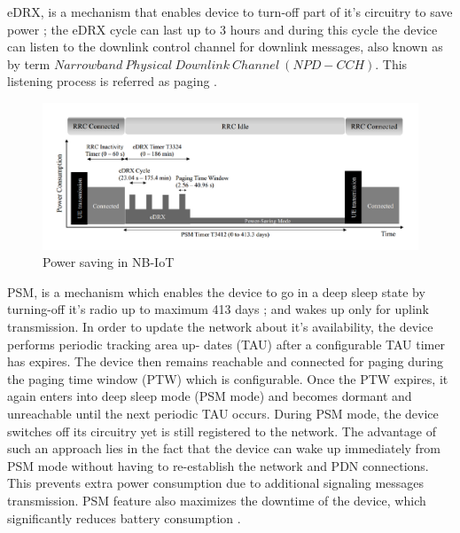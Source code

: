 \documentclass[12pt]{article}
\begin{document}
eDRX, is a mechanism that enables device to turn-off part of it's circuitry to save power \cite{el2018evaluating}; the eDRX cycle can last up to 3 hours \cite{farrell2018low} and during this cycle the device can listen to the downlink control channel for downlink messages, also known as by term  $Narrowband\  Physical\  Downlink\  Channel\  (NPD-CCH)$. This listening process is referred as paging \cite{sultania2019implementation}.\par 

\begin{figure}[H]
    \centering
    \includegraphics[width=0.9\columnwidth]{Images/nbiotDRXcycle.pdf}
    \caption{Power saving in NB-IoT \cite{sultania2019implementation} }
    \label{fig:Power saving in NB-IoT}
\end{figure}

PSM, is a mechanism which enables the device to go in a deep sleep state by turning-off it's radio up to maximum 413 days \cite{sultania2019implementation}; and wakes up only for uplink transmission. In order to update the network about it's availability, the device performs periodic tracking area up- dates (TAU) after a configurable TAU timer has expires. The device then remains reachable and connected for paging during the paging time window (PTW) which is configurable. Once the PTW expires, it again enters into  deep sleep mode (PSM mode) and becomes dormant and unreachable until the next periodic TAU occurs. During PSM mode, the device switches off its circuitry yet is still registered to the network. The advantage of such an approach lies in the fact that the device can wake up immediately from PSM mode without having to re-establish the network and PDN connections. This prevents extra power consumption due to additional signaling messages transmission. PSM feature also maximizes the downtime of the device, which significantly reduces battery consumption \cite{rohdepowernbiot}.\par
\end{document}
